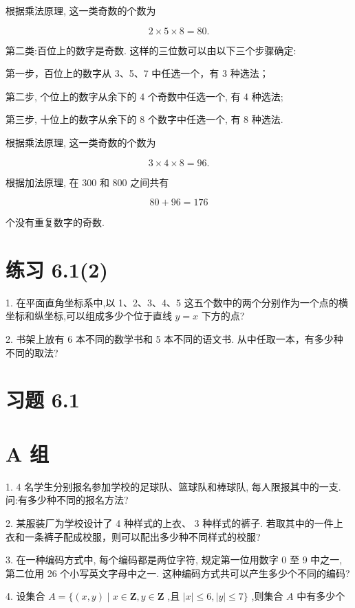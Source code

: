 \documentclass[10pt]{article}
\begin{document}
根据乘法原理, 这一类奇数的个数为

\[
2 \times  5 \times  8 = {80}.
\]

第二类:百位上的数字是奇数. 这样的三位数可以由以下三个步骤确定:

第一步，百位上的数字从 3、5、7 中任选一个，有 3 种选法；

第二步, 个位上的数字从余下的 4 个奇数中任选一个, 有 4 种选法;

第三步, 十位上的数字从余下的 8 个数字中任选一个, 有 8 种选法.

根据乘法原理, 这一类奇数的个数为

\[
3 \times  4 \times  8 = {96}.
\]

根据加法原理, 在 300 和 800 之间共有

\[
{80} + {96} = {176}
\]

个没有重复数字的奇数.

\section*{练习 6.1(2)}

1. 在平面直角坐标系中,以 1、2、3、4、5 这五个数中的两个分别作为一个点的横坐标和纵坐标,可以组成多少个位于直线 \(y = x\) 下方的点?

2. 书架上放有 6 本不同的数学书和 5 本不同的语文书. 从中任取一本，有多少种不同的取法?

\section*{习题 6.1}

\section*{A 组}

1. 4 名学生分别报名参加学校的足球队、篮球队和棒球队, 每人限报其中的一支. 问:有多少种不同的报名方法?

2. 某服装厂为学校设计了 4 种样式的上衣、 3 种样式的裤子. 若取其中的一件上衣和一条裤子配成校服，则可以配出多少种不同样式的校服?

3. 在一种编码方式中, 每个编码都是两位字符, 规定第一位用数字 0 至 9 中之一, 第二位用 26 个小写英文字母中之一. 这种编码方式共可以产生多少个不同的编码?

4. 设集合 \(A = \{ \left( {x,y}\right)  \mid  x \in  \mathbf{Z},y \in  \mathbf{Z}\) ,且 \(\left| x\right|  \leq  6,\left| y\right|  \leq  7\}\) ,则集合 \(A\) 中有多少个

\section*{}
\end{document}
